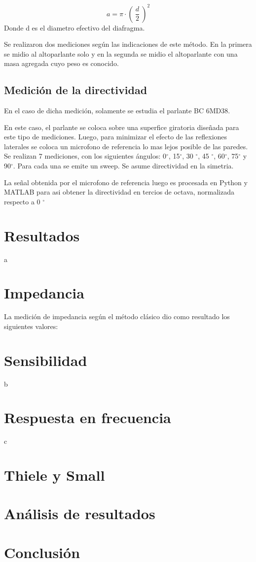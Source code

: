 \documentclass[]{article}
\makeatletter
\newcommand{\figura}[3]{
\vspace{0.2 cm}
\begin{figurehere}
\centering
\texttt{[image: \#1]}
\captionof{figure}{#2}
\label{#3}
\end{figurehere}
\vspace{0.2 cm}
}
\newenvironment{figurehere}   %
  {\def\@captype{figure}}   %
  {\par\medskip}
  {}              %
\makeatother
\begin{document}
\begin{multicols}{2}
\begin{equation}
a=\pi \cdot \left( \ \frac{d}{2} \ \right)^2
\end{equation}
Donde d es el diametro efectivo del diafragma.

Se realizaron dos mediciones según las indicaciones de este método. En la
primera se midio al altoparlante solo y en la segunda se midio el altoparlante
con una masa agregada cuyo peso es conocido.

\subsection{Medición de la directividad}
En el caso de dicha medición, solamente se estudia el parlante BC 6MD38.


En este caso, el parlante se coloca sobre una superfice giratoria diseñada para
este tipo de mediciones. Luego, para minimizar el efecto de las reflexiones laterales
se coloca un microfono de referencia lo mas lejos posible de las paredes.
Se realizan 7 mediciones, con los siguientes ángulos: 0$^\circ$, 15$^\circ$,
30 $^\circ$, 45 $^\circ$, 60$^\circ$, 75$^\circ$ y 90$^\circ$. Para cada una se
emite un sweep. Se asume directividad en la simetria.

La señal obtenida por el microfono de referencia luego es procesada
en Python y MATLAB para asi obtener la directividad en tercios de octava, normalizada
respecto a 0 $^\circ$
\section{Resultados}
a
\section{Impedancia}
La medición de impedancia según el método clásico dio como resultado
los siguientes valores:
\section{Sensibilidad}
b
\section{Respuesta en frecuencia}
c
\section{Thiele y Small}




\section{Análisis de resultados}

\section{Conclusión}


\printbibliography

\end{multicols}
\end{document}
